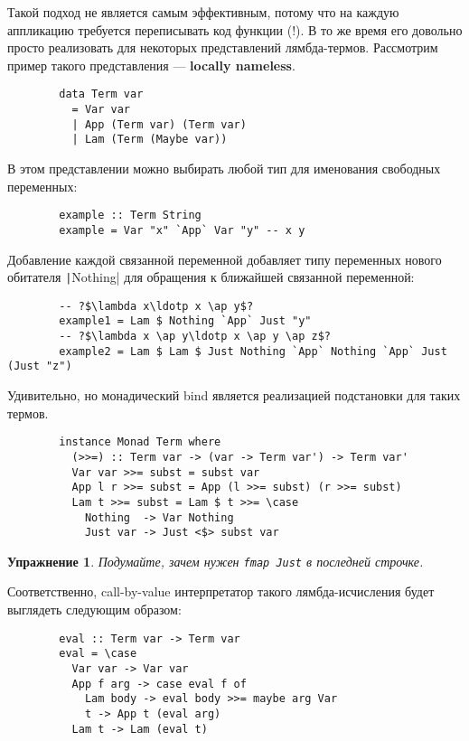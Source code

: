 \documentclass[12pt]{article}
\newcommand{\vocab}[1]{\textbf{#1}} %
\newcommand{\ap}{~}
\newtheorem{task}{Упражнение}
\begin{document}
    Такой подход не является самым эффективным, потому что на каждую аппликацию требуется переписывать код функции (!).
    В то же время его довольно просто реализовать для некоторых представлений лямбда-термов.
    Рассмотрим пример такого представления --- \vocab{locally nameless}.

    \begin{verbatim}
        data Term var
          = Var var
          | App (Term var) (Term var)
          | Lam (Term (Maybe var))
    \end{verbatim}

    В этом представлении можно выбирать любой тип для именования свободных переменных:
    \begin{verbatim}
        example :: Term String
        example = Var "x" `App` Var "y" -- x y
    \end{verbatim}
    Добавление каждой связанной переменной добавляет типу переменных нового обитателя \texttt|Nothing| для обращения к ближайшей связанной переменной:
    \begin{verbatim}
        -- ?$\lambda x\ldotp x \ap y$?
        example1 = Lam $ Nothing `App` Just "y"
        -- ?$\lambda x \ap y\ldotp x \ap y \ap z$?
        example2 = Lam $ Lam $ Just Nothing `App` Nothing `App` Just (Just "z")
    \end{verbatim}

    Удивительно, но монадический bind является реализацией подстановки для таких термов.

    \begin{verbatim}
        instance Monad Term where
          (>>=) :: Term var -> (var -> Term var') -> Term var'
          Var var >>= subst = subst var
          App l r >>= subst = App (l >>= subst) (r >>= subst)
          Lam t >>= subst = Lam $ t >>= \case
            Nothing  -> Var Nothing
            Just var -> Just <$> subst var
    \end{verbatim}

    \begin{task}
        Подумайте, зачем нужен \texttt{fmap Just} в последней строчке.
    \end{task}

    Соответственно, call-by-value интерпретатор такого лямбда-исчисления будет выглядеть следующим образом:

    \begin{verbatim}
        eval :: Term var -> Term var
        eval = \case
          Var var -> Var var
          App f arg -> case eval f of
            Lam body -> eval body >>= maybe arg Var
            t -> App t (eval arg)
          Lam t -> Lam (eval t)
    \end{verbatim}
\end{document}
